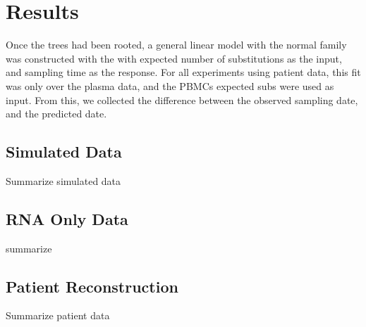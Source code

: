 \section{Results} \label{sec:results}
Once the trees had been rooted, a general linear model with the normal family was constructed with the with expected number of substitutions as the input, and sampling time as the response. For all experiments using patient data, this fit was only over the plasma data, and the PBMCs expected subs were used as input. From this, we collected the difference between the observed sampling date, and the predicted date. 

\subsection{Simulated Data} \label{sec:sim_results}
Summarize simulated data

\subsection{RNA Only Data} \label{sec:rna_only}
summarize 

\subsection{Patient Reconstruction}
Summarize patient data
